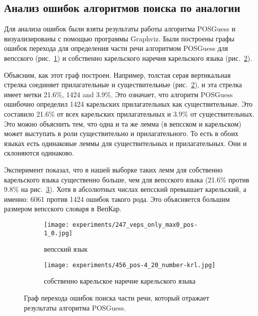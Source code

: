 \subsection{Анализ ошибок алгоритмов поиска по аналогии}

Для анализа ошибок были взяты результаты работы алгоритма POSGuess и визуализированы с помощью программы Graphviz.
%
%
%
Были построены графы ошибок перехода для определения части речи алгоритмом POSGuess для вепсского
(рис.~\ref{fig:pos-error-graph-vep}) и собственно карельского наречия карельского языка (рис.~\ref{fig:pos-error-graph-krl}).

Объясним, как этот граф построен.
Например, толстая серая вертикальная стрелка соединяет прилагательные и существительные (рис.~\ref{fig:pos-error-graph-krl}), и эта стрелка имеет метки 21.6\%, 1424 and 3.9\%. 
Это означает, что алгоритм POSGuess ошибочно определил 1424 карельских прилагательных как существительные. 
Это составило 21.6\% от всех карельских прилагательных и 3.9\% от существительных.
Это можно объяснить тем, что
одна и та же лемма (в вепсском и карельском) может выступать в роли существительно и прилагательного. 
То есть в обоих языках есть одинаковые леммы для существительных и прилагательных.
Они и склоняются одинаково.

Эксперимент показал, что в нашей выборке таких лемм для собственно 
карельского языка существенно больше, чем для вепсского языка 
(21.6\% против 9.8\% на рис.~\ref{fig:pos-error-graph}). 
Хотя в абсолютных числах вепсский превышает карельский, а именно: 
6061 против 1424 ошибок такого рода. Это объясняется большим размером вепсского словаря в ВепКар.

\begin{figure}
\centering
\begin{subfigure}{.5\textwidth}
  \centering
  \texttt{[image: experiments/247\_veps\_only\_max0\_pos-1\_0.jpg]}
  \caption{вепсский язык}
  \label{fig:pos-error-graph-vep}
\end{subfigure}%
\begin{subfigure}{.5\textwidth}
  \centering
\texttt{[image: experiments/456\_pos-4\_20\_number-krl.jpg]}  \caption{собственно карельское наречие карельского языка}
  \label{fig:pos-error-graph-krl}
\end{subfigure}
\caption{Граф перехода ошибок поиска части речи, который отражает результаты алгоритма POSGuess. }
\label{fig:pos-error-graph}
\end{figure}
